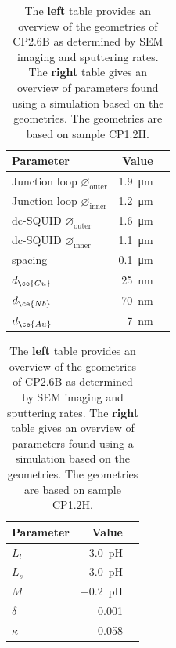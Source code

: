 \begin{table}
	\begin{subtable}{.5\linewidth}
		\centering
		\begin{tabular}{@{}lrr@{}}
			\toprule
			Parameter & Value \\ \midrule
			Junction loop $\diameter_{\text{outer}}$ & \qty{1.9}{\micro\meter} \\
			Junction loop $\diameter_{\text{inner}}$ & \qty{1.2}{\micro\meter} \\
			dc-SQUID $\diameter_{\text{outer}}$ & \qty{1.6}{\micro\meter} \\
			dc-SQUID $\diameter_{\text{inner}}$ & \qty{1.1}{\micro\meter} \\
			spacing & \qty{0.1}{\micro\meter} \\
			$d_{\ce{Cu}}$ & \qty{25}{\nano\meter} \\
			$d_{\ce{Nb}}$ & \qty{70}{\nano\meter} \\
			$d_{\ce{Au}}$ & \qty{7}{\nano\meter} \\
			\bottomrule
		\end{tabular}
    \end{subtable}
    \begin{subtable}{.5\linewidth}
    	\centering
    	\begin{tabular}{@{}lrr@{}}
    		\toprule
    		Parameter & Value \\ \midrule
    		$L_{l}$ & \qty{3.0}{\pico\henry} \\
			$L_{s}$ & \qty{3.0}{\pico\henry} \\
			$M$ & \qty{-0.2}{\pico\henry} \\
			$\delta$ & \num{0.001} \\
			$\kappa$ & \num{-0.058} \\
    		\bottomrule
    	\end{tabular}
    \end{subtable}
    \caption{The \textbf{left} table provides an overview of the geometries of CP2.6B as determined by SEM imaging and sputtering rates. The \textbf{right} table gives an overview of parameters found using a simulation based on the geometries. The geometries are based on sample CP1.2H.}
    \label{tab:CP2.6B-geometries}
\end{table}